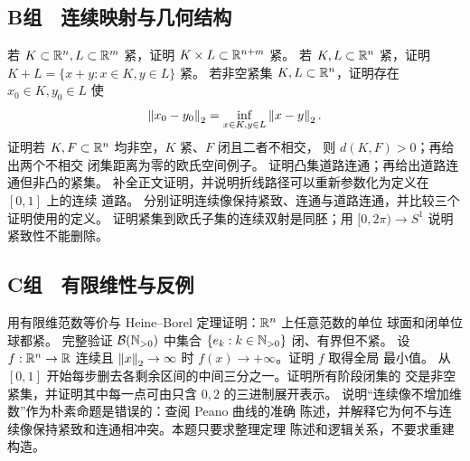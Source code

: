 \subsection*{B组　连续映射与几何结构}
\begin{enumerate}[label=\textbf{\thechapter.\arabic*.},resume]
 若 \(K\subset\mathbb{R}^n,L\subset\mathbb{R}^m\) 紧，证明
 \(K\times L\subset\mathbb{R}^{n+m}\) 紧。
 若 \(K,L\subset\mathbb{R}^n\) 紧，证明
 \(K+L=\{x+y:x\in K,y\in L\}\) 紧。
 若非空紧集 \(K,L\subset\mathbb{R}^n\)，证明存在 \(x_0\in K,y_0\in L\) 使
 \[
  \left\lVert x_0-y_0\right\rVert_2=\inf_{x\in K,y\in L}\left\lVert x-y\right\rVert_2.
 \]
 证明若 \(K,F\subset\mathbb{R}^n\) 均非空，\(K\) 紧、\(F\) 闭且二者不相交，
 则 \(d(K,F)>0\)；再给出两个不相交
 闭集距离为零的欧氏空间例子。
 证明凸集道路连通；再给出道路连通但非凸的紧集。
 补全正文证明，并说明折线路径可以重新参数化为定义在 \([0,1]\) 上的连续
 道路。
 分别证明连续像保持紧致、连通与道路连通，并比较三个证明使用的定义。
 证明紧集到欧氏子集的连续双射是同胚；用
 \([0,2\pi)\to S^1\) 说明紧致性不能删除。
\end{enumerate}

\subsection*{C组　有限维性与反例}
\begin{enumerate}[label=\textbf{\thechapter.\arabic*.},resume]
 用有限维范数等价与 Heine--Borel 定理证明：\(\mathbb{R}^n\) 上任意范数的单位
 球面和闭单位球都紧。
 完整验证 \(\mathcal B(\mathbb{N}_{>0})\) 中集合
 \(\{e_k:k\in\mathbb{N}_{>0}\}\) 闭、有界但不紧。
 设 \(f:\mathbb{R}^n\to\mathbb{R}\) 连续且
 \(\left\lVert x\right\rVert_2\to\infty\) 时 \(f(x)\to+\infty\)。证明 \(f\) 取得全局
 最小值。
 从 \([0,1]\) 开始每步删去各剩余区间的中间三分之一。证明所有阶段闭集的
 交是非空紧集，并证明其中每一点可由只含 \(0,2\) 的三进制展开表示。
 说明“连续像不增加维数”作为朴素命题是错误的：查阅 Peano 曲线的准确
 陈述，并解释它为何不与连续像保持紧致和连通相冲突。本题只要求整理定理
 陈述和逻辑关系，不要求重建构造。
\end{enumerate}
